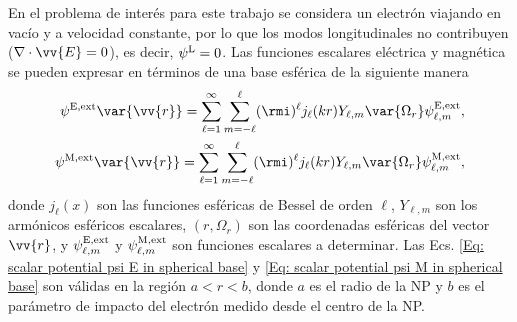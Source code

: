 En el problema de interés para este trabajo se considera un electrón viajando en vacío y a velocidad constante, por lo que los modos longitudinales no contribuyen ($\nabla\cdot\vv{E}=0$), es decir, $\psi^{\rm L} = 0$. Las funciones escalares eléctrica y magnética se pueden expresar en términos de una base esférica de la siguiente manera \cite{de1999relativistic}
\begin{align}
\psi^{\rm E, ext}\var{\vv{r}} = \sum_{\ell=1}^{\infty}\sum_{m=-\ell}^{\ell}(\rmi)^{\ell} j_{\ell}(kr) Y_{\ell, m}\var{\Omega_r}\psi_{\ell,m}^{\rm E, ext},\label{Eq: scalar potential psi E in spherical base}\\
\psi^{\rm M, ext}\var{\vv{r}} = \sum_{\ell=1}^{\infty}\sum_{m=-\ell}^{\ell}(\rmi)^{\ell} j_{\ell}(kr) Y_{\ell, m}\var{\Omega_r}\psi_{\ell,m}^{\rm M, ext}, \label{Eq: scalar potential psi M in spherical base}
\end{align}
donde $j_{\ell}(x)$ son las funciones esféricas de Bessel de orden $\ell$, $Y_{\ell, m}$ son los armónicos esféricos escalares, $(r, \Omega_r)$ son las coordenadas esféricas del vector $\vv{r}$, y $\psi_{\ell,m}^{\rm E, ext}$ y $\psi_{\ell,m}^{\rm M, ext}$ son funciones escalares a determinar. Las Ecs. \eqref{Eq: scalar potential psi E in spherical base} y \eqref{Eq: scalar potential psi M in spherical base} son válidas en la región $a < r < b$, donde $a$ es el radio de la NP y $b$ es el parámetro de impacto del electrón medido desde el centro de la NP.  

